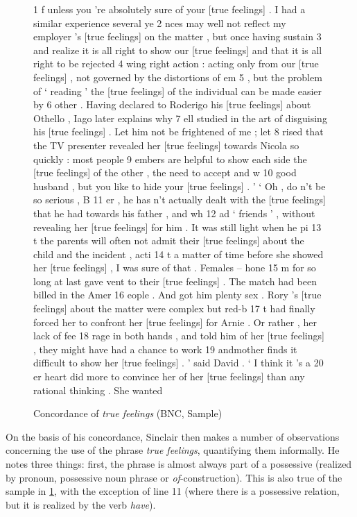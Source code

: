 \begin{figure}[!htbp]
\caption{Concordance of \textit{true feelings} (BNC, Sample)}
\label{fig:truefeelings}
\begin{fitverb}
 1 f unless you 're absolutely sure of your [true feelings] . I had a similar experience several ye
 2 nces may well not reflect my employer 's [true feelings] on the matter , but once having sustain
 3  and realize it is all right to show our [true feelings] and that it is all right to be rejected
 4 wing right action : acting only from our [true feelings] , not governed by the distortions of em
 5     , but the problem of ` reading ' the [true feelings] of the individual can be made easier by
 6  other . Having declared to Roderigo his [true feelings] about Othello , Iago later explains why
 7 ell studied in the art of disguising his [true feelings] . Let him not be frightened of me ; let
 8 rised that the TV presenter revealed her [true feelings] towards Nicola so quickly : most people
 9 embers are helpful to show each side the [true feelings] of the other , the need to accept and w
10 good husband , but you like to hide your [true feelings] . ' ` Oh , do n't be so serious , B
11  er , he has n't actually dealt with the [true feelings] that he had towards his father , and wh
12  ad  ` friends ' , without revealing her [true feelings] for him . It was still light when he pi
13 t the parents will often not admit their [true feelings] about the child and the incident , acti
14 t a matter of time before she showed her [true feelings] , I was sure of that . Females -- hone
15 m for so long at last gave vent to their [true feelings] . The match had been billed in the Amer
16 eople . And got him plenty sex . Rory 's [true feelings] about the matter were complex but red-b
17 t had finally forced her to confront her [true feelings] for Arnie . Or rather , her lack of fee
18 rage in both hands , and told him of her [true feelings] , they might have had a chance to work 
19 andmother finds it difficult to show her [true feelings] . ' said David . ` I think it 's a 
20 er heart did more to convince her of her [true feelings] than any rational thinking . She wanted
\end{fitverb}
\end{figure}

On the basis of his concordance, Sinclair then makes a number of observations concerning the use of the phrase \textit{true feelings}, quantifying them informally. He notes three things: first, the phrase is almost always part of a possessive (realized by pronoun, possessive noun phrase or \textit{of}-construction). This is also true of the sample in \ref{fig:truefeelings}, with the exception of line 11 (where there is a possessive relation, but it is realized by the verb \textit{have}).

